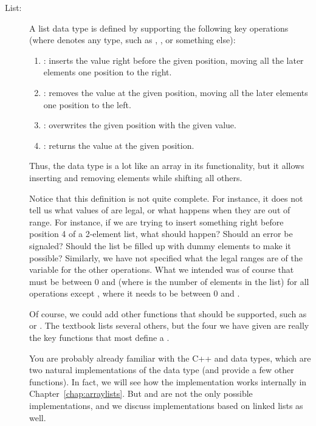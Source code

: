 \begin{description}
\item[List:] A list data type is defined by supporting the following
  key operations (where  denotes any type, such as ,
  , or something else):
\begin{enumerate}
\item {}:
  inserts the value right before the given position,
  moving all the later elements one position to the right.
\item {}:
  removes the value at the given position,
  moving all the later elements one position to the left.
\item {}:
  overwrites the given position with the given value.
\item {}:
  returns the value at the given position.
\end{enumerate}

Thus, the  data type is a lot like an array in its functionality,
but it allows inserting and removing elements while shifting all others.

Notice that this definition is not quite complete.
For instance, it does not tell us what values of  are legal,
or what happens when they are out of range.
For instance, if we are trying to insert something right before
position 4 of a 2-element list, what should happen?
Should an error be signaled?
Should the list be filled up with dummy elements to make it possible?
Similarly, we have not specified what the legal ranges are of the
 variable for the other operations.
What we intended was of course that  must be between 0
and 
(where  is the number of elements in the list)
for all operations except ,
where it needs to be between 0 and .

Of course, we could add other functions that should be supported,
such as  or .
The textbook lists several others,
but the four we have given are really the key functions that most
define a .

You are probably already familiar with the C++  and
 data types, which are two natural implementations of the
 data type (and provide a few other functions).
In fact, we will see how the  implementation works
internally in Chapter~\ref{chap:arraylists}.
But  and  are not the only possible implementations,
and we discuss implementations based on linked lists as well.


\end{description}

